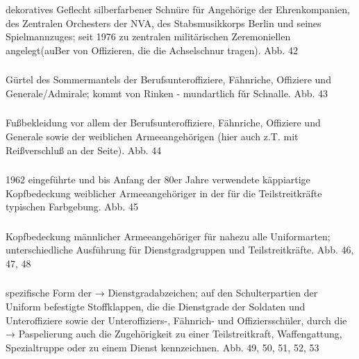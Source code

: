 \subsubsection*{}%

dekoratives Geflecht silberfarbener Schnüre für Angehörige der Ehrenkompanien, des Zentralen Orchesters der NVA, des Stabsmusikkorps Berlin und seines Spielmannzuges; seit 1976 zu zentralen militärischen Zeremoniellen angelegt(auBer von Offizieren, die die Achselschnur tragen). Abb. 42

\subsubsection*{}%

Gürtel des Sommermantels der Berufsunteroffiziere, Fähnriche, Offiziere und Generale/Admirale; kommt von Rinken - mundartlich fǔr Schnalle. Abb. 43

\subsubsection*{}%

Fußbekleidung vor allem der Berufsunteroffiziere, Fähnriche, Offiziere und Generale sowie der weiblichen Armeeangehörigen (hier auch z.T. mit Reißverschluß an der
Seite). Abb. 44

\subsubsection*{}%

1962 eingeführte und bis Anfang der 80er Jahre verwendete käppiartige Kopfbedeckung weiblicher Armeeangehöriger in der für die Teilstreitkräfte typischen Farbgebung. Abb. 45

\subsubsection*{}%

Kopfbedeckung männlicher Armeeangehöriger für nahezu alle Uniformarten; unterschiedliche Ausführung für Dienstgradgruppen und Teilstreitkräfte. Abb. 46, 47, 48

\subsubsection*{}%

spezifische Form der → Dienstgradabzeichen; auf den Schulterpartien der Uniform befestigte Stoffklappen, die die Dienstgrade der Soldaten und Unteroffiziere sowie der Unteroffiziers-, Fähnrich- und Offiziersschüler, durch die → Paspelierung auch die Zugehörigkeit zu einer Teilstreitkraft, Waffengattung, Spezialtruppe oder zu einem Dienst kennzeichnen. Abb. 49, 50, 51, 52, 53


